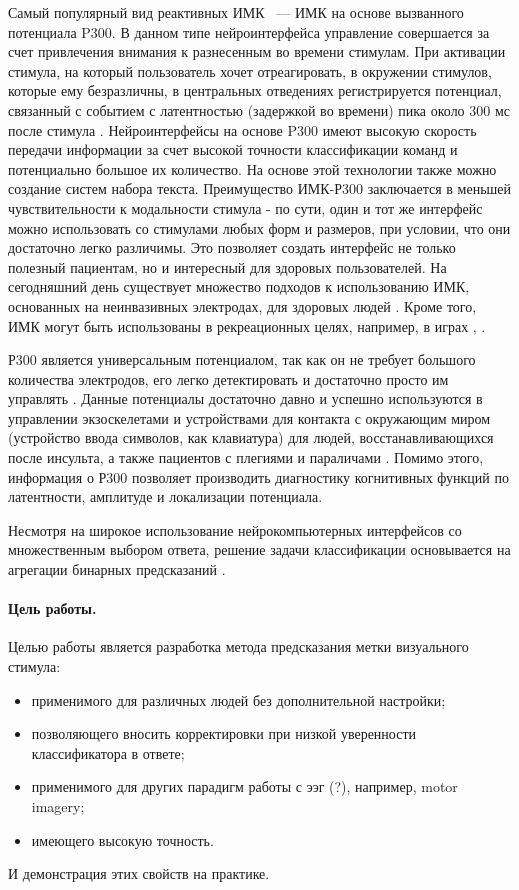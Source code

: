 \documentclass[12pt]{article}
\begin{document}
	Самый популярный вид реактивных ИМК ~--- ИМК на основе вызванного потенциала P300. В данном типе нейроинтерфейса управление совершается за счет привлечения внимания к разнесенным во времени стимулам. При активации стимула, на который пользователь хочет отреагировать, в окружении стимулов, которые ему безразличны, в центральных отведениях регистрируется потенциал, связанный с событием с латентностью (задержкой во времени) пика около 300 мс после стимула \cite{polich2007updating}. Нейроинтерфейсы на основе P300 имеют высокую скорость передачи информации за счет высокой точности классификации команд и потенциально большое их количество. На основе этой технологии также можно создание систем набора текста. Преимущество ИМК-Р300 заключается в меньшей чувствительности к модальности стимула - по сути, один и тот же интерфейс можно использовать со стимулами любых форм и размеров, при условии, что они достаточно легко различимы. Это позволяет создать интерфейс не только полезный пациентам, но и интересный для здоровых пользователей. На сегодняшний день существует множество подходов к использованию ИМК, основанных на неинвазивных электродах, для здоровых людей \cite{NER_2015}. Кроме того, ИМК могут быть использованы в рекреационных целях, например, в играх \cite{Recreational_Applications}, \cite{Kaplan_Shishkin_games}.
	
	Р300 является универсальным потенциалом, так как он не требует большого количества электродов, его легко детектировать и достаточно просто им управлять \cite{from_sasha1}.  Данные потенциалы достаточно давно и успешно используются в управлении экзоскелетами \cite{fromsasha2} и устройствами для контакта с окружающим миром (устройство ввода символов, как клавиатура) для людей, восстанавливающихся после инсульта, а также пациентов с плегиями и параличами \cite{formsasha3}. Помимо этого, информация о Р300 позволяет производить диагностику когнитивных функций по латентности, амплитуде и локализации потенциала\cite{fromsasha4}.
	
	Несмотря на широкое использование нейрокомпьютерных интерфейсов со множественным выбором ответа, решение задачи классификации основывается на агрегации бинарных предсказаний \cite{sth_binary}.
	
	
	
	\paragraph{Цель работы.}
	Целью работы является разработка метода предсказания метки визуального стимула:
	\begin{itemize}
		\item применимого для различных людей без дополнительной настройки;
		\item позволяющего вносить корректировки при низкой уверенности классификатора в ответе;
		\item применимого для других парадигм работы с ээг (?), например, motor imagery;
		\item имеющего высокую точность.
	\end{itemize}
	И демонстрация этих свойств на практике.
	
\end{document}
